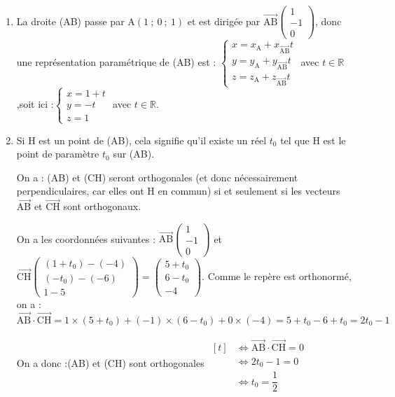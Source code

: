 \documentclass[10pt]{article}
\providecommand{\R}{\mathbb{R}}
\providecommand{\vect}[1]{\overrightarrow{#1}}
\begin{document}
\begin{enumerate}
	\item La droite (AB) passe par A$(1~;~0~;~1)$ et est dirigée par $\vect{\mathrm{AB}} \begin{pmatrix}1\\-1\\0\end{pmatrix}$, donc une représentation paramétrique de (AB) est :
	\quad
	$\begin{cases}x = x_\mathrm{A} + x_{\mathrm{\vect{\mathrm{AB}}}}t\\y = y_\mathrm{A} + y_{\mathrm{\vect{\mathrm{AB}}}}t\\z = z _\mathrm{A} + z _{\mathrm{\vect{\mathrm{AB}}}}t \end{cases}$ avec $t \in\R$,\quad soit ici :\quad $\begin{cases} x = 1 + t\\y= -t\\z = 1	\end{cases}$ avec $t \in \R$.

	\item Si H est un point de (AB), cela signifie qu'il existe un réel $t_0$ tel que H est le point de paramètre $t_0$ sur (AB).

On a : (AB) et (CH) seront orthogonales (et donc nécessairement perpendiculaires, car elles ont H en commun) si et seulement si les vecteurs $\vect{\mathrm{AB}}$ et $\vect{\mathrm{CH}}$ sont orthogonaux.

On a les coordonnées suivantes : \quad $\vect{\mathrm{AB}} \begin{pmatrix}1\\-1\\0\end{pmatrix}$ et $\vect{\mathrm{CH}}\begin{pmatrix}(1 + t_0) - (-4)\\(-t_0) - (-6) \\1 - 5\end{pmatrix} =\begin{pmatrix}5 + t_0 \\ 6 - t_0 \\ -4\end{pmatrix}$. Comme le repère est orthonormé, on a :\quad $\vect{\mathrm{AB}}\cdot\vect{\mathrm{CH}} = 1\times (5 + t_0) + (-1) \times (6 - t_0) + 0\times (-4) = 5 + t_0 - 6 + t_0 = 2t_0 - 1$

On a donc :\quad (AB) et (CH) sont orthogonales $\begin{aligned}[t] &\iff \vect{\mathrm{AB}}\cdot \vect{\mathrm{CH}} = 0\\
	&\iff 2t_0 - 1 = 0\\
	&\iff t_0 = \dfrac{1}{2}\end{aligned}$


\end{enumerate}
\end{document}
